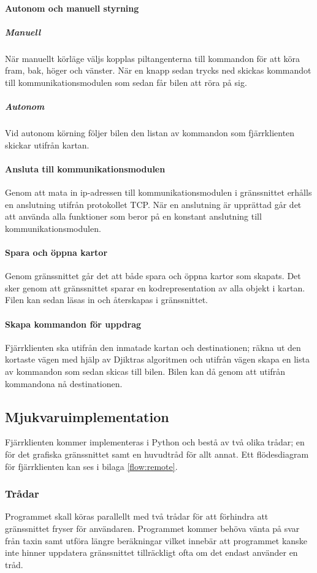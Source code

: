 \documentclass[tekniskrapport/tech.tex]{subfiles}
\begin{document}
\paragraph{Autonom och manuell styrning}

\subparagraph{Manuell}
När manuellt körläge väljs kopplas piltangenterna till kommandon för att köra fram, bak, höger och vänster. När en knapp sedan trycks ned skickas kommandot till kommunikationsmodulen som sedan får bilen att röra på sig.

\subparagraph{Autonom}
Vid autonom körning följer bilen den listan av kommandon som fjärrklienten skickar utifrån kartan.

\paragraph{Ansluta till kommunikationsmodulen}
Genom att mata in ip-adressen till kommunikationsmodulen i gränssnittet erhålls en anslutning utifrån protokollet TCP. När en anslutning är upprättad går det att använda alla funktioner som beror på en konstant anslutning till kommunikationsmodulen.

\paragraph{Spara och öppna kartor}
Genom gränssnittet går det att både spara och öppna kartor som skapats. Det sker genom att gränssnittet sparar en kodrepresentation av alla objekt i kartan. Filen kan sedan läsas in och återskapas i gränssnittet.

\paragraph{Skapa kommandon för uppdrag}
Fjärrklienten ska utifrån den inmatade kartan och destinationen; räkna ut den
kortaste vägen med hjälp av Djiktras algoritmen och utifrån vägen skapa en lista av kommandon som sedan skicas till bilen. Bilen kan då genom att utifrån kommandona nå destinationen.

\subsection{Mjukvaruimplementation}
Fjärrklienten kommer implementeras i Python och bestå av två olika trådar; en
för det grafiska gränssnittet samt en huvudtråd för allt annat. Ett
flödesdiagram för fjärrklienten kan ses i bilaga \ref{flow:remote}.

\subsubsection{Trådar}
Programmet skall köras parallellt med två trådar för att förhindra att
gränssnittet fryser för användaren. Programmet kommer behöva vänta på svar från
taxin samt utföra längre beräkningar vilket innebär att programmet kanske inte
hinner uppdatera gränssnittet tillräckligt ofta om det endast använder en tråd.
\end{document}
